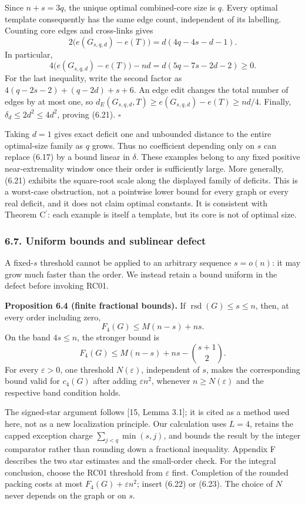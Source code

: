 \documentclass[english,11pt,a4paper]{article}
\begin{document}
Since \(n+s=3q\), the unique optimal combined-core size is \(q\). Every optimal template consequently has the same edge count, independent of its labelling. Counting core edges and cross-links gives \[
2\bigl(e(G_{s,q,d})-e(T)\bigr)
=d(4q-4s-d-1).
\] In particular, \[
4\bigl(e(G_{s,q,d})-e(T)\bigr)-nd
=d(5q-7s-2d-2)\ge0.
\] For the last inequality, write the second factor as \(4(q-2s-2)+(q-2d)+s+6\). An edge edit changes the total number of edges by at most one, so \(d_E(G_{s,q,d},T)\ge e(G_{s,q,d})-e(T)\ge nd/4\). Finally, \(\delta_d\le2d^2\le4d^2\), proving (6.21). \(\square\)

Taking \(d=1\) gives exact deficit one and unbounded distance to the entire optimal-size family as \(q\) grows. Thus no coefficient depending only on \(s\) can replace (6.17) by a bound linear in \(\delta\). These examples belong to any fixed positive near-extremality window once their order is sufficiently large. More generally, (6.21) exhibits the square-root scale along the displayed family of deficits. This is a worst-case obstruction, not a pointwise lower bound for every graph or every real deficit, and it does not claim optimal constants. It is consistent with Theorem \texorpdfstring{C\ensuremath{^{\prime}}}{C'}: each example is itself a template, but its core is not of optimal size.

\subsubsection{6.7. Uniform bounds and sublinear defect}\label{uniform-bounds-and-sublinear-defect}

A fixed-\(s\) threshold cannot be applied to an arbitrary sequence \(s=o(n)\): it may grow much faster than the order. We instead retain a bound uniform in the defect before invoking RC01.


\textbf{Proposition 6.4 (finite fractional bounds).} If \(\operatorname{rsd}(G)\le s\le n\), then, at every order including zero, \[
F_4(G)\le M(n-s)+ns.
\tag{6.22}
\] On the band \(4s\le n\), the stronger bound is \[
F_4(G)\le M(n-s)+ns-\binom{s+1}{2}.
\tag{6.23}
\] For every \(\varepsilon>0\), one threshold \(N(\varepsilon)\), independent of \(s\), makes the corresponding bound valid for \(c_4(G)\) after adding \(\varepsilon n^2\), whenever \(n\ge N(\varepsilon)\) and the respective band condition holds.

The signed-star argument follows {[}15, Lemma 3.1{]}; it is cited as a method used here, not as a new localization principle. Our calculation uses \(L=4\), retains the capped exception charge \(\sum_{j<q}\min(s,j)\), and bounds the result by the integer comparator rather than rounding down a fractional inequality. Appendix F describes the two star estimates and the small-order check. For the integral conclusion, choose the RC01 threshold from \(\varepsilon\) first. Completion of the rounded packing costs at most \(F_4(G)+\varepsilon n^2\); insert (6.22) or (6.23). The choice of \(N\) never depends on the graph or on \(s\).
\end{document}
